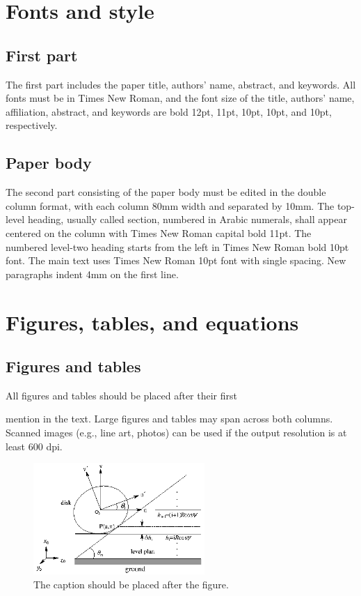 \documentclass[10pt,twocolumn]{ICCAS}
\begin{document}
\section{Fonts and style}

\subsection{First part}
The first part includes the paper title, authors' name, abstract,
and keywords. All fonts must be in Times New Roman, and the font
size of the title, authors' name, affiliation, abstract, and
keywords are bold 12pt, 11pt, 10pt, 10pt, and 10pt, respectively.

\subsection{Paper body}
The second part consisting of the paper body must be edited in the double column format, with each column 80mm width and separated by 10mm. The top-level heading, usually called section, numbered in Arabic numerals, shall appear centered on the column with Times New Roman capital bold 11pt. The numbered level-two heading starts from the left in Times New Roman bold 10pt font. The main text uses Times New Roman 10pt font with single spacing. New paragraphs indent 4mm on the first line.

\section{Figures, tables, and equations}

\subsection{Figures and tables}
All figures and tables should be placed after their first 

\newpage
\noindent
mention in the text. Large
figures and tables may span across both columns. Scanned images (e.g., line art, photos)
can be used if the output resolution is at least 600 dpi.

\begin{figure}[thb]
\begin{center}
\includegraphics[width=6.5cm]{test.eps}
\caption{\label{test}The caption should be placed after the figure.}
\end{center}
\end{figure}
\end{document}
